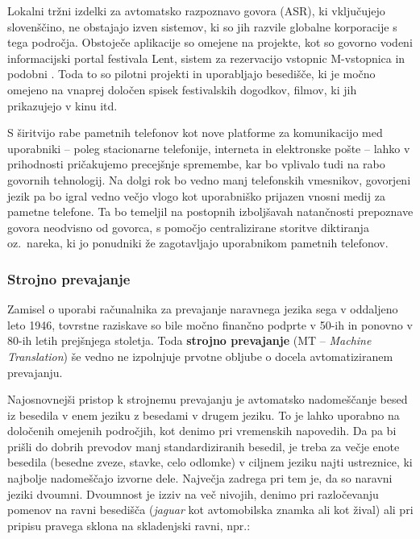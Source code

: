 \begin{multicols}{2}
Lokalni tržni izdelki za avtomatsko razpoznavo go\-vora (ASR), ki vključujejo slovenščino, ne obstajajo izven sistemov, ki so jih razvile globalne kor\-poracije s tega področja. Obstoječe aplikacije so omejene na projekte, kot so go\-vorno vodeni informacij\-ski portal festivala Lent, \cite{Lent1} sistem za rezervacijo vstopnic M-vstopnica  in podobni \cite{Kolosej1}. Toda to so pilotni projekti in uporab\-ljajo besedišče, ki je močno omejeno na vnaprej določen spisek festivalskih dogodkov, filmov, ki jih prikazujejo v kinu itd.

S širitvijo rabe pametnih telefonov kot nove platforme za komunikacijo med uporabniki – poleg stacionarne telefonije, interneta in elektronske pošte – lahko v prihodnosti pričakujemo precejšnje spremembe, kar bo vplivalo tudi na rabo go\-vornih tehnologij. Na dolgi rok bo vedno manj telefonskih vmesnikov, go\-vorjeni jezik pa bo igral vedno večjo vlogo kot uporabniško prijazen vnosni medij za pametne telefone. Ta bo temeljil na postopnih izboljšavah natančnosti prepoznave go\-vora neodvisno od go\-vorca, s pomočjo centralizirane storitve diktiranja oz.~nareka, ki jo ponudniki že zagotav\-ljajo uporabnikom pametnih telefonov.

\subsubsection{Strojno prevajanje}

Zamisel o uporabi računalnika za prevajanje naravnega jezika sega v oddaljeno leto 1946, tovrstne raziskave so bile močno finančno podprte v 50-ih in ponovno v 80-ih letih prejšnjega stoletja. Toda \textbf{strojno prevajanje} (MT – \textit{Machine Translation}) še vedno ne izpolnjuje prvotne ob\-ljube o docela avtomatiziranem prevajanju.


Naj\-osnovnejši pristop k stroj\-nemu prevajanju je avtomatsko nadomeščanje besed iz besedila v enem jeziku z besedami v drugem jeziku. To je lahko uporabno na določenih omejenih področjih, kot denimo pri vremenskih napovedih. Da pa bi prišli do dobrih prevodov manj standardiziranih besedil, je treba za večje enote besedila (besedne zveze, stavke, celo odlomke) v ciljnem jeziku naj\-ti ustreznice, ki naj\-bolje nadomeščajo izvorne dele. Naj\-večja zadrega pri tem je, da so naravni jeziki dvoumni. Dvoumnost je izziv na več nivojih, denimo pri razločevanju po\-menov na ravni besedišča (\textit{jaguar} kot avtomobilska znamka ali kot žival) ali pri pripisu pravega sklona na skladenjski ravni, npr.:


\end{multicols}

